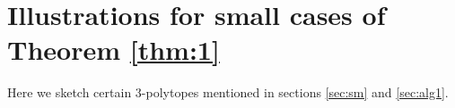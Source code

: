 \documentclass[11pt]{article}
\theoremstyle{definition}
\numberwithin{equation}{section}
\def\calP{\mathcal{P}}
\begin{document}


\section{Illustrations for small cases of Theorem \ref{thm:1}}
\label{appb}
Here we sketch certain $3$-polytopes mentioned in sections \ref{sec:sm} and \ref{sec:alg1}.
\end{document}
